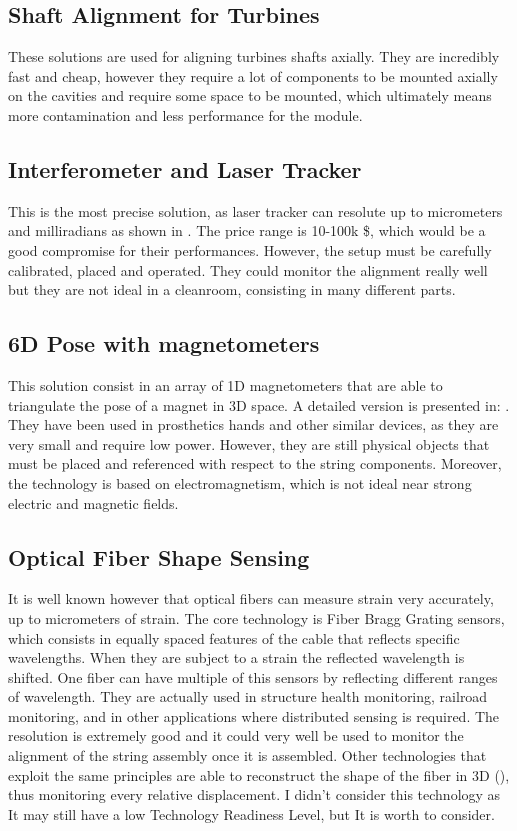 \documentclass[12pt,a4paper]{article}
\begin{document}
\subsection{Shaft Alignment for Turbines}
These solutions are used for aligning turbines shafts axially. They are incredibly fast and cheap, however they require a lot of components to be mounted axially on the  cavities and require some space to be mounted, which ultimately means more contamination and less performance for the module.

\subsection{Interferometer and Laser Tracker} 
This is the most precise solution, as laser tracker can resolute up to micrometers and milliradians as shown in \cite{Laser_triangulation}.
 The price range is 10-100k \$, which would be a good compromise for their performances. However, the setup must be carefully calibrated, placed and operated. They could monitor the alignment really well but they are not ideal in a cleanroom, consisting in many different parts.

\subsection{6D Pose with magnetometers}
This solution consist in an array of 1D magnetometers that are able to triangulate the pose of a magnet in 3D space. A detailed version is presented in: \cite{magnetometer}. They have been used in prosthetics hands and other similar devices, as they are very small and require low power. However, they are still physical objects that must be placed and referenced with respect to the string components. Moreover, the technology is based on electromagnetism, which is not ideal near strong electric and magnetic fields.


\subsection{Optical Fiber Shape Sensing}
It is well known however that optical fibers can measure strain very accurately, up to micrometers of strain. The core technology is Fiber Bragg Grating sensors, which consists in equally spaced features of the cable that reflects specific wavelengths. When they are subject to a strain the reflected wavelength is shifted. One fiber can have multiple of this sensors by reflecting different ranges of wavelength. They are actually used in structure health monitoring, railroad monitoring, and in other applications where distributed sensing is required. The resolution is extremely good and it could very well be used to monitor the alignment of the string assembly once it is assembled.
Other technologies that exploit the same principles are able to reconstruct the shape of the fiber in 3D (\cite{fiberopticsshapesensing}), thus monitoring every relative displacement. I didn't consider this technology as It may still have a low Technology Readiness Level, but It is worth to consider.
\end{document}
